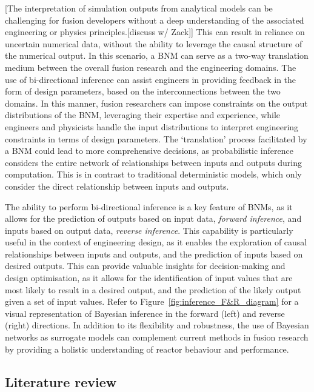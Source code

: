 \documentclass[journal]{IEEEtran}
\begin{document}
[The interpretation of simulation outputs from analytical models can be challenging for fusion developers without a deep understanding of the associated engineering or physics principles.[discuss w/ Zack]] This can result in reliance on uncertain numerical data, without the ability to leverage the causal structure of the numerical output. In this scenario, a BNM can serve as a two-way translation medium between the overall fusion research and the engineering domains. The use of bi-directional inference can assist engineers in providing feedback in the form of design parameters, based on the interconnections between the two domains. In this manner, fusion researchers can impose constraints on the output distributions of the BNM, leveraging their expertise and experience, while engineers and physicists handle the input distributions to interpret engineering constraints in terms of design parameters. The `translation' process facilitated by a BNM could lead to more comprehensive decisions, as probabilistic inference considers the entire network of relationships between inputs and outputs during computation. This is in contrast to traditional deterministic models, which only consider the direct relationship between inputs and outputs. 

The ability to perform bi-directional inference is a key feature of BNMs, as it allows for the prediction of outputs based on input data, \textit{forward inference}, and inputs based on output data, \textit{reverse inference}. This capability is particularly useful in the context of engineering design, as it enables the exploration of causal relationships between inputs and outputs, and the prediction of inputs based on desired outputs. This can provide valuable insights for decision-making and design optimisation, as it allows for the identification of input values that are most likely to result in a desired output, and the prediction of the likely output given a set of input values. Refer to Figure~\ref{fig:inference_F&R_diagram} for a visual representation of Bayesian inference in the forward (left) and reverse (right) directions. In addition to its flexibility and robustness, the use of Bayesian networks as surrogate models can complement current methods in fusion research by providing a holistic understanding of reactor behaviour and performance. 
    
\subsection{Literature review}~\label{sec:background}
\end{document}
